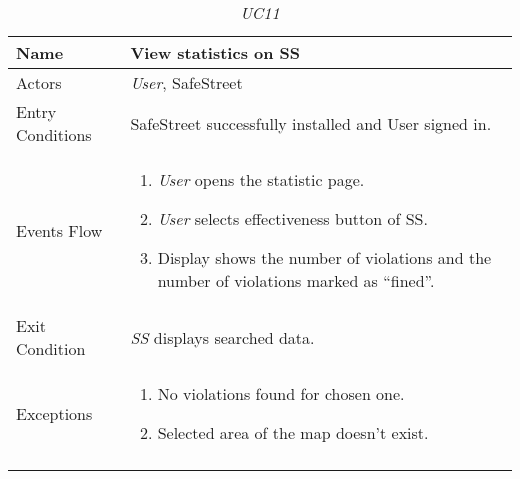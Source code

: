 \documentclass[../../../RASD.tex]{subfiles}
\begin{document}
    \begin{center}
        \begin{longtable}{| p{.35\linewidth} | p{.65\linewidth} |}
            \hline
            \textbf{Name} & \textbf{View statistics on SS}\\ \hline
            Actors & \textit{User}, SafeStreet\\ \hline
            Entry Conditions & SafeStreet successfully installed and User signed in.\\ \hline
            Events Flow &
            \begin{enumerate}
                \item \textit{User} opens the statistic page.
                \item \textit{User} selects effectiveness button of SS.
                \item  Display shows the number of violations and the number of violations marked as “fined”.
            \end{enumerate}
            \\ \hline
            Exit Condition & \textit{SS} displays searched data.\\ \hline
            Exceptions &
            \begin{enumerate}
                \item No violations found for chosen one.
                \item Selected area of the map doesn’t exist.
            \end{enumerate}
            \\
            \hline
            \caption{\textit{UC11}}
        \end{longtable}
    \end{center}
    \newpage
\end{document}
